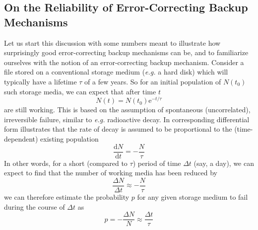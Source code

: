 \documentclass[11pt]{article}
\begin{document}
\begin{mainmatter}
\subsection{On the Reliability of Error-Correcting Backup Mechanisms}

Let us start this discussion with some numbers meant to illustrate how surprisingly good error-correcting backup mechanisms can be, and to familiarize ourselves with the notion of an error-correcting backup mechanism. Consider a file stored on a conventional storage medium (\emph{e.g.} a hard disk) which will typically have a lifetime $\tau$ of a few years. So for an initial population of $N(t_0)$ such storage media, we can expect that after time $t$
\begin{equation}
N(t) = N(t_0) \mathrm e^{-t / \tau}
\end{equation}
are still working. This is based on the assumption of spontaneous (uncorrelated), irreversible failure, similar to \emph{e.g.} radioactive decay. In corresponding differential form illustrates that the rate of decay is assumed to be proportional to the (time-dependent) existing population
\begin{equation}
\frac{\mathrm d N}{\mathrm d t} = -\frac{N}{\tau}
\end{equation}
In other words, for a short (compared to $\tau$) period of time $\Delta t$ (say, a day), we can expect to find that the number of working media has been reduced by
\begin{equation}
\frac{\Delta N}{\Delta t} \approx -\frac{N}{\tau}
\end{equation}
we can therefore estimate the probability $p$ for any given storage medium to fail during the course of $\Delta t$ as
\begin{equation}
p = -\frac{\Delta N}{N} \approx \frac{\Delta t}{\tau}
\label{destroySmall}
\end{equation}


\end{mainmatter}
\end{document}

